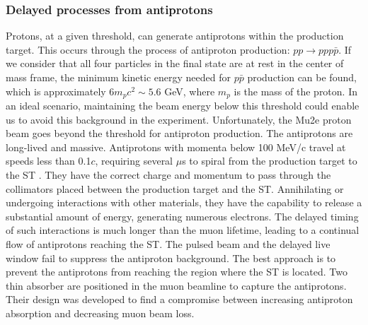 \subsubsection{Delayed processes from antiprotons}
Protons, at a given threshold, can generate antiprotons 
within the production target. This occurs through the 
process of antiproton production: $pp \rightarrow ppp\bar{p}$. 
If we consider that all four particles in the final state are 
at rest in the center of mass frame, the minimum kinetic energy 
needed for $p\bar{p}$ production can be found, which is 
approximately $6 m_pc^2 \sim 5.6$ GeV, where $m_p$ is the 
mass of the proton. In an ideal scenario, maintaining the 
beam energy below this threshold could enable us to avoid 
this background in the experiment. Unfortunately, the Mu2e 
proton beam goes beyond the threshold for antiproton production. 
The antiprotons are long-lived and massive. Antiprotons with 
momenta below 100 MeV/c travel at speeds less than 0.1$c$, 
requiring several $\mu$s to spiral from the production target 
to the ST \cite{bartoszek2015mu2e}. They have the correct 
charge and momentum to pass through the collimators placed 
between the production target and the ST. Annihilating or 
undergoing interactions with other materials, they have the 
capability to release a substantial amount of energy, generating 
numerous electrons. The delayed timing of 
such interactions is much longer than the muon lifetime, leading to a 
continual flow of antiprotons reaching the ST. The pulsed beam and 
the delayed live window fail to suppress the antiproton background. 
The best approach is to prevent the antiprotons from reaching the 
region where the ST is located.
Two thin absorber are positioned in 
the muon beamline to capture the antiprotons. Their design was 
developed to find a compromise between increasing antiproton 
absorption and decreasing muon beam loss. 

